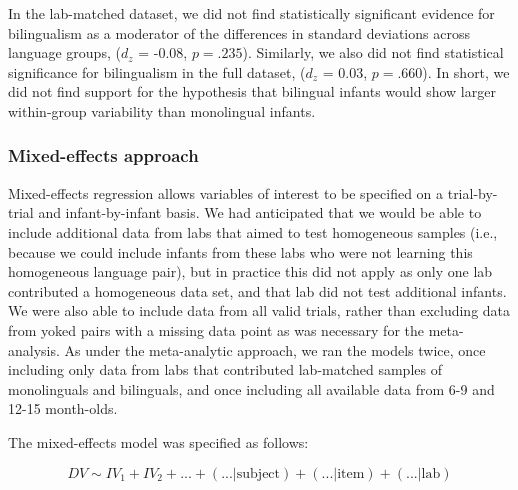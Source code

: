 \documentclass[
  english,
  ,man,floatsintext]{apa6}
\begin{document}
In the lab-matched dataset, we did not find statistically significant evidence for bilingualism as a moderator of the differences in standard deviations across language groups, (\(d_z\) = -0.08, \(p = .235\)). Similarly, we also did not find statistical significance for bilingualism in the full dataset, (\(d_z\) = 0.03, \(p = .660\)). In short, we did not find support for the hypothesis that bilingual infants would show larger within-group variability than monolingual infants.

\hypertarget{mixed-effects-approach}{%
\subsubsection{Mixed-effects approach}\label{mixed-effects-approach}}

Mixed-effects regression allows variables of interest to be specified on a trial-by-trial and infant-by-infant basis. We had anticipated that we would be able to include additional data from labs that aimed to test homogeneous samples (i.e., because we could include infants from these labs who were not learning this homogeneous language pair), but in practice this did not apply as only one lab contributed a homogeneous data set, and that lab did not test additional infants. We were also able to include data from all valid trials, rather than excluding data from yoked pairs with a missing data point as was necessary for the meta-analysis. As under the meta-analytic approach, we ran the models twice, once including only data from labs that contributed lab-matched samples of monolinguals and bilinguals, and once including all available data from 6-9 and 12-15 month-olds.

The mixed-effects model was specified as follows:

\[DV \sim IV_1 + IV_2 + \text{...} + (\text{...} | \text{subject}) + (\text{...} | \text{item}) + (\text{...} | \text{lab})\]
\end{document}

